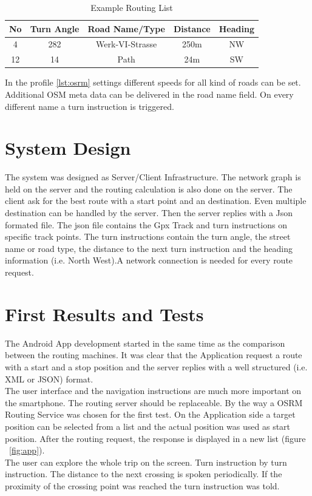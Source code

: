 \documentclass{sig-alternate}
\begin{document}
\begin{table}
\centering
\caption{Example Routing List}
\begin{tabular}{|c|c|c|c|c|} \hline
No&Turn Angle&Road Name/Type&Distance&Heading\\ \hline
4&282&Werk-VI-Strasse&250m&NW\\ \hline
12&14&Path&24m&SW\\ \hline
\end{tabular}
\label{tab:rlist}
\end{table}

In the profile \ref{lst:osrm} settings different speeds for all kind of roads can be set. Additional OSM meta data can be delivered in the road name field. On every different name a turn instruction is triggered. 




\section{System Design}
The system was designed as Server/Client Infrastructure. The network graph is held on the server and the routing calculation is also done on the server.  The client ask for the best route with a start point and an destination. Even multiple destination can be handled by the server. Then the server replies with a Json formated file. The json file contains the Gpx Track and turn instructions on specific track points. The turn instructions contain the turn angle, the street name or road type, the distance to the next turn instruction and the heading information (i.e. North West).A network connection is needed for every route request. 

\section{First Results and Tests}
The Android App development started in the same time as the comparison between the routing machines. It was clear that the Application request a route with a start and a stop position and the server replies with a well structured (i.e. XML or JSON) format. \\
The user interface and the navigation instructions are much more important on the smartphone. The routing server should be replaceable. 
By the way a OSRM Routing Service was chosen for the first test. On the Application side a target position can be selected from a list and the actual position was used as start position. After the routing request, the response is displayed in a new list (figure ~\ref{fig:app}). \\
The user can explore the whole trip on the screen. Turn instruction by turn instruction. The distance to the next crossing is spoken periodically. If the proximity of the crossing point was reached the turn instruction was told. \\
\end{document}
